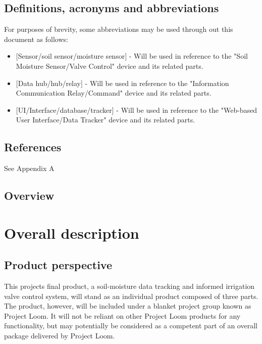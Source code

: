 \documentclass[onecolumn, draftclsnofoot,10pt, compsoc]{IEEEtran}
\begin{document}
	\subsection{Definitions, acronyms and abbreviations}
	For purposes of brevity, some abbreviations may be used through out this document as follows:
	\begin{itemize}
		\item{[Sensor/soil sensor/moisture sensor] - Will be used in reference to the "Soil Moisture Sensor/Valve Control" device and its related parts.}
		\item{[Data hub/hub/relay] - Will be used in reference to the "Information Communication Relay/Command" device and its related parts.}
		\item{[UI/Interface/database/tracker] - Will be used in reference to the "Web-based User Interface/Data Tracker" device and its related parts.}
	\end{itemize}
	\subsection{References}
	See Appendix A
	\subsection{Overview}
	
	\section{Overall description}
	\subsection{Product perspective}
	This projects final product, a soil-moisture data tracking and informed irrigation valve control system, will stand as an individual product composed of three parts.
	The product, however, will be included under a blanket project group known as Project Loom.
	It will not be reliant on other Project Loom products for any functionality, but may potentially be considered as a competent part of an overall package delivered by Project Loom.
	
	
\end{document}
